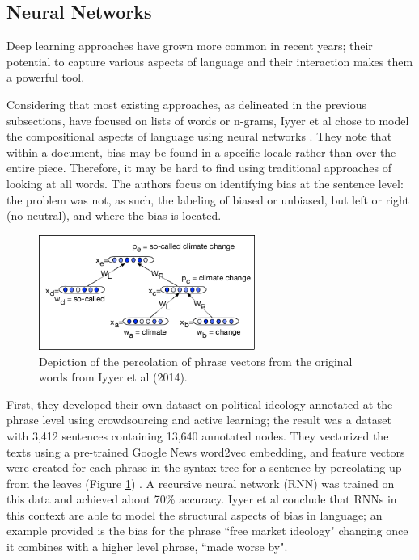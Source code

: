 \documentclass[11pt, a4paper]{article}
\begin{document}
\subsection{Neural Networks}

Deep learning approaches have grown more common in recent years; their potential to capture various aspects of language and their interaction makes them a powerful tool.

Considering that most existing approaches, as delineated in the previous subsections, have focused on lists of words or n-grams, Iyyer et al chose to model the compositional aspects of language using neural networks \cite{iyyer2014political}. They note that within a document, bias may be found in a specific locale rather than over the entire piece. Therefore, it may be hard to find using traditional approaches of looking at all words. The authors focus on identifying bias at the sentence level: the problem was not, as such, the labeling of biased or unbiased, but left or right (no neutral), and where the bias is located. 

\begin{figure}
\centering
\includegraphics[width=200pt]{iyyer2014political.png}
\caption{Depiction of the percolation of phrase vectors from the original words from Iyyer et al (2014).}
\label{fig:iyyer2014tree}
\end{figure}

First, they developed their own dataset on political ideology annotated at the phrase level using crowdsourcing and active learning; the result was a dataset with 3,412 sentences containing 13,640 annotated nodes. They vectorized the texts using a pre-trained Google News word2vec embedding, and feature vectors were created for each phrase in the syntax tree for a sentence by percolating up from the leaves (Figure \ref{fig:iyyer2014tree}) \cite{mikolov2013word2vec}. A recursive neural network (RNN) was trained on this data and achieved about 70\% accuracy. Iyyer et al conclude that RNNs in this context are able to model the structural aspects of bias in language; an example provided is the bias for the phrase ``free market ideology" changing once it combines with a higher level phrase, ``made worse by".
\end{document}
